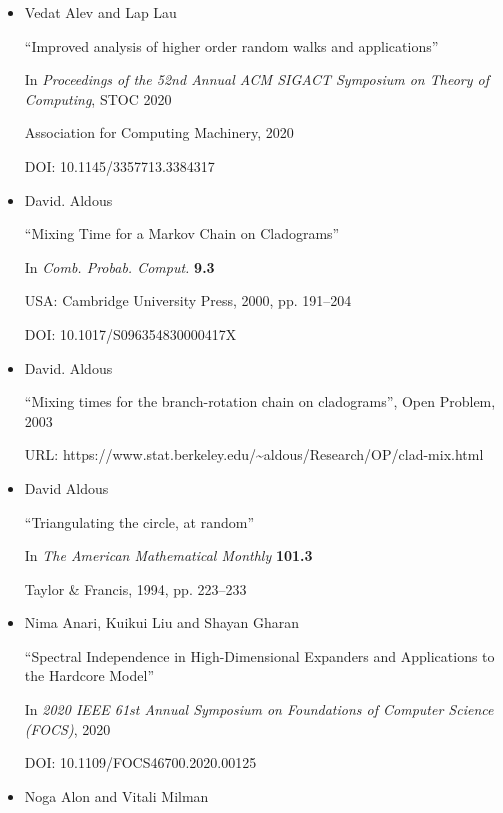 \documentclass[10pt,a4paper]{article}
\begin{document}
\begin{itemize}

      

\item[] [AL20]
Vedat Alev and Lap Lau

“Improved analysis of higher order random walks and applications”

In \emph{Proceedings of the 52nd Annual ACM SIGACT Symposium on Theory of Computing}, STOC 2020

Association for Computing Machinery, 2020

DOI: 10.1145/3357713.3384317


      

\item[] [Ald00]
David. Aldous

“Mixing Time for a Markov Chain on Cladograms”

In \emph{Comb. Probab. Comput.} \textbf{9.3}

USA: Cambridge University Press, 2000, pp. 191–204

DOI: 10.1017/S096354830000417X


      

\item[] [Ald03]
David. Aldous

“Mixing times for the branch-rotation chain on cladograms”, Open Problem, 2003

URL: https://www.stat.berkeley.edu/\textasciitilde{}aldous/Research/OP/clad-mix.html


      

\item[] [Ald94]
David Aldous

“Triangulating the circle, at random”

In \emph{The American Mathematical Monthly} \textbf{101.3}

Taylor \& Francis, 1994, pp. 223–233


      

\item[] [ALG20]
Nima Anari, Kuikui Liu and Shayan Gharan

“Spectral Independence in High-Dimensional Expanders and Applications to the Hardcore Model”

In \emph{2020 IEEE 61st Annual Symposium on Foundations of Computer Science (FOCS)}, 2020

DOI: 10.1109/FOCS46700.2020.00125


      

\item[] [AM85]
Noga Alon and Vitali Milman


\end{itemize}
\end{document}
